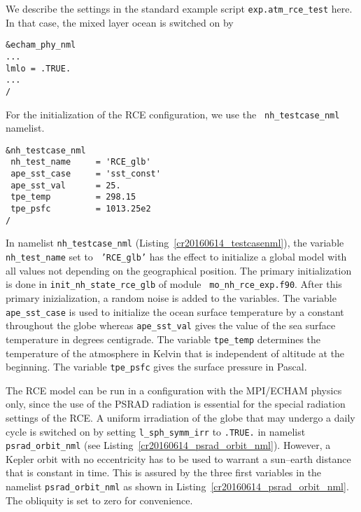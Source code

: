 We describe the settings in the standard example script 
{\tt exp.atm\_rce\_test} here. In that case, the mixed layer ocean is
switched on by

\begin{lstlisting}[caption=Mixed layer ocean switch in {\tt
    exp.atm\_rce\_test}, label=cr20160614_lmlonml]
&echam_phy_nml
...
lmlo = .TRUE.
...
/
\end{lstlisting}

For the initialization of the RCE configuration, we use the {\tt
  nh\_testcase\_nml} namelist. 

\begin{lstlisting}[caption=Testcase namelist for RCE in {\tt
    exp.atm\_ape\_test}, label=cr20160614_testcasenml]
&nh_testcase_nml
 nh_test_name     = 'RCE_glb'
 ape_sst_case     = 'sst_const'
 ape_sst_val      = 25.
 tpe_temp         = 298.15
 tpe_psfc         = 1013.25e2
/
\end{lstlisting}

In namelist {\tt nh\_testcase\_nml} (Listing~\ref{cr20160614_testcasenml}), 
the variable {\tt nh\_test\_name} set to {\tt
  'RCE\_glb'} has the effect to initialize a global model with all
values not depending on the geographical position. The primary initialization
is done in {\tt init\_nh\_state\_rce\_glb} of module {\tt
  mo\_nh\_rce\_exp.f90}. After this primary inizialization, a random
noise is added to the variables. The variable {\tt ape\_sst\_case} is used to
initialize the ocean surface temperature by a constant throughout the
globe whereas {\tt ape\_sst\_val} gives the value of the sea surface
temperature in degrees centigrade. The variable {\tt tpe\_temp} determines
the temperature of the atmosphere in Kelvin that is independent of altitude at
the beginning. The variable {\tt tpe\_psfc} gives the surface pressure
in Pascal.

The
RCE model can be run in a configuration with the MPI/ECHAM physics only, since 
the use of the PSRAD radiation is essential for the special radiation
settings of the RCE. 
A uniform irradiation of the globe that may undergo a daily cycle is
switched on by setting
{\tt l\_sph\_symm\_irr} to {\tt .TRUE.} in namelist {\tt
  psrad\_orbit\_nml} (see
Listing~\ref{cr20160614_psrad_orbit_nml}). However, a Kepler orbit
with 
no eccentricity has to be used to warrant a sun--earth distance that
is constant in time. This is assured by the three first variables in
the namelist {\tt psrad\_orbit\_nml} as shown in
Listing~\ref{cr20160614_psrad_orbit_nml}. The obliquity is set to zero
for convenience.

